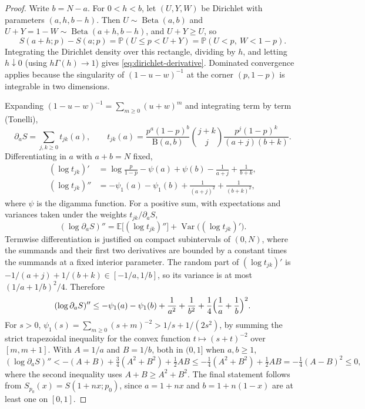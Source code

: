 \documentclass[11pt]{article}
\newcommand{\E}{\mathbb E}
\newcommand{\Pb}{\mathbb P}
\DeclareMathOperator{\Beta}{Beta}
\DeclareMathOperator{\Var}{Var}
\newcommand{\Bfun}{\mathrm{B}}
\theoremstyle{definition}
\begin{document}
\begin{proof}
Write $b=N-a$. For $0<h<b$, let $(U,Y,W)$ be Dirichlet with parameters
$(a,h,b-h)$. Then $U\sim\Beta(a,b)$ and $U+Y=1-W\sim\Beta(a+h,b-h)$, and
$U+Y\geq U$, so
\begin{equation*}
S(a+h;p)-S(a;p)=\Pb(U\leq p<U+Y)=\Pb(U<p,\ W<1-p).
\end{equation*}
Integrating the Dirichlet density over this rectangle, dividing by $h$, and
letting $h\downarrow0$ (using $h\Gamma(h)\to1$) gives
\eqref{eq:dirichlet-derivative}. Dominated convergence applies because the
singularity of $(1-u-w)^{-1}$ at the corner $(p,1-p)$ is integrable in two
dimensions.

Expanding $(1-u-w)^{-1}=\sum_{m\geq0}(u+w)^m$ and integrating term by term
(Tonelli),
\begin{equation*}
\partial_aS=\sum_{j,k\geq0}t_{jk}(a),\qquad
t_{jk}(a)=\frac{p^a(1-p)^b}{\Bfun(a,b)}
\binom{j+k}{j}\frac{p^j(1-p)^k}{(a+j)(b+k)}.
\end{equation*}
Differentiating in $a$ with $a+b=N$ fixed,
\begin{align*}
(\log t_{jk})'&=\log\tfrac{p}{1-p}-\psi(a)+\psi(b)
-\tfrac1{a+j}+\tfrac1{b+k},\\
(\log t_{jk})''&=-\psi_1(a)-\psi_1(b)+\tfrac1{(a+j)^2}+\tfrac1{(b+k)^2},
\end{align*}
where $\psi$ is the digamma function. For a positive sum, with expectations
and variances taken under the weights $t_{jk}/\partial_aS$,
\begin{equation*}
(\log\partial_aS)''
=\E\bigl[(\log t_{jk})''\bigr]+\Var\bigl((\log t_{jk})'\bigr).
\end{equation*}
Termwise differentiation is justified on compact subintervals of $(0,N)$,
where the summands and their first two derivatives are bounded by a constant
times the summands at a fixed interior parameter. The random part of
$(\log t_{jk})'$ is $-1/(a+j)+1/(b+k)\in[-1/a,1/b]$, so its variance is at
most $(1/a+1/b)^2/4$. Therefore
\begin{equation*}
(\log\partial_aS)''\leq-\psi_1(a)-\psi_1(b)+\frac1{a^2}+\frac1{b^2}
+\frac14\Bigl(\frac1a+\frac1b\Bigr)^2.
\end{equation*}
For $s>0$, $\psi_1(s)=\sum_{m\geq0}(s+m)^{-2}>1/s+1/(2s^2)$, by summing the
strict trapezoidal inequality for the convex function $t\mapsto(s+t)^{-2}$
over $[m,m+1]$. With $A=1/a$ and $B=1/b$, both in $(0,1]$ when
$a,b\geq1$,
\begin{equation*}
(\log\partial_aS)''<-(A+B)+\tfrac34(A^2+B^2)+\tfrac12AB
\leq-\tfrac14(A^2+B^2)+\tfrac12AB=-\tfrac14(A-B)^2\leq0,
\end{equation*}
where the second inequality uses $A+B\geq A^2+B^2$. The final statement
follows from $S_{p_0}(x)=S(1+nx;p_0)$, since $a=1+nx$ and $b=1+n(1-x)$ are
at least one on $[0,1]$.
\end{proof}
\end{document}
